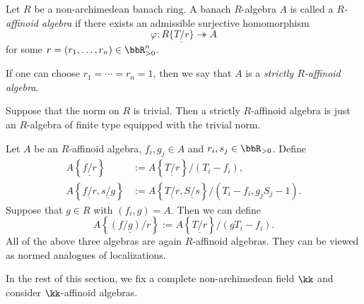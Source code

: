 

    \begin{definition}\label{def:affinoid_algebras}
        Let \(R\) be a non-archimedean banach ring.
        A banach \(R\)-algebra \(A\) is called a \emph{\(R\)-affinoid algebra} if there exists an admissible surjective homomorphism
        \[
            \varphi: R\{ \underline{T/r} \} \twoheadrightarrow A
        \]
        for some \(r = (r_1, \ldots, r_n) \in \bbR_{>0}^n\).

        If one can choose \(r_1 = \cdots = r_n = 1\), then we say that \(A\) is a \emph{strictly \(R\)-affinoid algebra}.
    \end{definition}

    \begin{example}\label{eg:affinoid_algebra_for_trivial_norm}
        Suppose that the norm on \(R\) is trivial.
        Then a strictly \(R\)-affinoid algebra is just an \(R\)-algebra of finite type equipped with the trivial norm.
    \end{example}

    \begin{example}\label{eg:normed_localization_as_affinoid_algebra}
        Let \(A\) be an \(R\)-affinoid algebra, \(f_i,g_j \in A\) and \(r_i,s_j \in \bbR_{>0}\).
        Define
        \begin{align*}
            A\left\{ \underline{f/r} \right\} & := A\left\{ \underline{T/r} \right\} / (T_i - f_i), \\
            A\left\{ \underline{f/r}, \underline{s/g} \right\} & := A\left\{ \underline{T/r}, \underline{S/s} \right\} / (T_i - f_i, g_j S_j - 1). 
        \end{align*}
        Suppose that \(g \in R\) with \((f_i,g) = A\).
        Then we can define
        \[
            A\left\{ \underline{(f/g)/r} \right\} := A\left\{ \underline{T/r} \right\} / (g T_i - f_i).
        \]
        All of the above three algebras are again \(R\)-affinoid algebras.
        They can be viewed as normed analogues of localizations.
    \end{example}

    In the rest of this section, we fix a complete non-archimedean field \(\kk\) and consider \(\kk\)-affinoid algebras.


